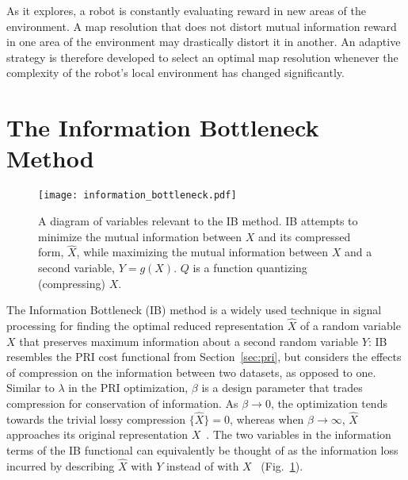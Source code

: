 As it explores, a robot is constantly evaluating reward in new areas of the
environment. A map resolution that does not distort mutual information reward in one area
of the environment may drastically distort it in another. An adaptive strategy
is therefore developed to select an optimal map resolution whenever the complexity of the
robot's local environment has changed significantly.


\section{The Information Bottleneck Method}

\begin{figure}[h]
  \centering
  \texttt{[image: information\_bottleneck.pdf]}
  \caption[Diagram of the Information Bottleneck.]{A diagram of variables
  relevant to the IB method. IB attempts to minimize the mutual information
between $X$ and its compressed form, $\hat{X}$, while maximizing the mutual information
between $X$ and a second variable, $Y = g(X)$. $Q$ is a function quantizing
(compressing) $X$.\label{fig:ib_diagram}}
\end{figure}

The Information Bottleneck (IB) method is a widely used technique in signal processing for
finding the optimal reduced representation $\hat{X}$ of a random variable $X$ that preserves
maximum information about a second random variable $Y$:
%
%
IB resembles the PRI cost functional from Section~\ref{sec:pri}, but considers the effects of
compression on the information between two datasets, as opposed to one. Similar to $\lambda$
in the PRI optimization, $\beta$ is a design parameter that trades compression for conservation
of information. As $\beta \rightarrow 0$, the optimization tends towards the trivial lossy
compression $\{\hat{X}\}=0$, whereas when $\beta \rightarrow \infty$, $\hat{X}$ approaches
its original representation $X$~\cite{principe2010information}. The two
variables in the information terms of the IB functional can equivalently be thought of as the
information loss incurred by describing $\hat{X}$ with $Y$ instead of with
$X$~\cite{geiger2011information,geiger2013signal} (Fig.~\ref{fig:ib_diagram}).

